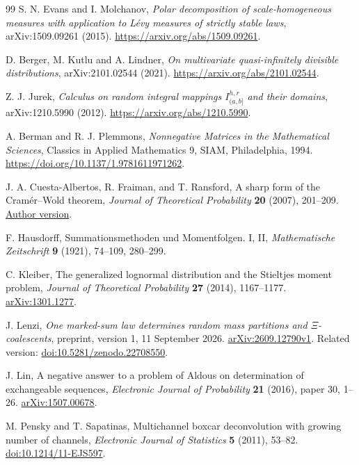 \documentclass[11pt,letterpaper]{article}
\theoremstyle{definition}
\theoremstyle{remark}
\newcommand{\1}{\mathbf 1}
\begin{document}
\begin{thebibliography}{99}
S. N. Evans and I. Molchanov,
\emph{Polar decomposition of scale-homogeneous measures with application
to L\'evy measures of strictly stable laws}, arXiv:1509.09261 (2015).
\url{https://arxiv.org/abs/1509.09261}.


D. Berger, M. Kutlu and A. Lindner,
\emph{On multivariate quasi-infinitely divisible distributions},
arXiv:2101.02544 (2021).
\url{https://arxiv.org/abs/2101.02544}.


Z. J. Jurek,
\emph{Calculus on random integral mappings $I^{h,r}_{(a,b]}$ and their domains},
arXiv:1210.5990 (2012).
\url{https://arxiv.org/abs/1210.5990}.


A. Berman and R. J. Plemmons,
\emph{Nonnegative Matrices in the Mathematical Sciences},
Classics in Applied Mathematics 9, SIAM, Philadelphia, 1994.
\url{https://doi.org/10.1137/1.9781611971262}.


J. A. Cuesta-Albertos, R. Fraiman, and T. Ransford,
A sharp form of the Cram\'er--Wold theorem,
\emph{Journal of Theoretical Probability} \textbf{20} (2007), 201--209.
\href{https://personales.unican.es/cuestaj/CramerWold.pdf}{Author version}.


F. Hausdorff,
Summationsmethoden und Momentfolgen. I, II,
\emph{Mathematische Zeitschrift} \textbf{9} (1921), 74--109, 280--299.


C. Kleiber,
The generalized lognormal distribution and the Stieltjes moment problem,
\emph{Journal of Theoretical Probability} \textbf{27} (2014), 1167--1177.
\href{https://arxiv.org/abs/1301.1277}{arXiv:1301.1277}.


J. Lenzi,
\emph{One marked-sum law determines random mass partitions and
$\Xi$-coalescents}, preprint, version 1, 11 September 2026.
\href{https://arxiv.org/abs/2609.12790v1}{arXiv:2609.12790v1}.
Related version: \href{https://doi.org/10.5281/zenodo.22708550}{doi:10.5281/zenodo.22708550}.


J. Lin,
A negative answer to a problem of Aldous on determination of
exchangeable sequences,
\emph{Electronic Journal of Probability} \textbf{21} (2016), paper 30,
1--26.
\href{https://arxiv.org/abs/1507.00678}{arXiv:1507.00678}.


M. Pensky and T. Sapatinas,
Multichannel boxcar deconvolution with growing number of channels,
\emph{Electronic Journal of Statistics} \textbf{5} (2011), 53--82.
\href{https://doi.org/10.1214/11-EJS597}{doi:10.1214/11-EJS597}.



\end{thebibliography}
\end{document}
